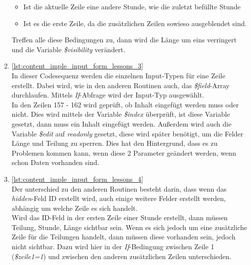 \begin{enumerate}
\begin{itemize}
		\item Ist die aktuelle Zeile eine andere Stunde, wie die zuletzt befüllte Stunde
		\item Ist es die erste Zeile, da die zusätzlichen Zeilen sowieso ausgeblendet sind.
	\end{itemize}
	Treffen alle diese Bedingungen zu, dann wird die Länge um eins verringert und die Variable \textit{\$visibility} verändert.\\
	
	\item \autoref{lst:content_imple_input_form_lessons_3}\\
	In dieser Codesequenz werden die einzelnen Input-Typen für eine Zeile erstellt. Dabei wird, wie in den anderen Routinen auch, das \textit{\$field}-Array durchlaufen. Mittels \textit{If}-Abfrage wird der Input-Typ ausgewählt.\\
	In den Zeilen 157 - 162 wird geprüft, ob Inhalt eingefügt werden muss oder nicht. Dies wird mittels der Variable \textit{\$index} überprüft, ist diese Variable gesetzt, dann muss ein Inhalt eingefügt werden. Außerdem wird auch die Variable \textit{\$edit} auf \textit{readonly} gesetzt, diese wird später benötigt, um die Felder Länge und Teilung zu sperren. Dies hat den Hintergrund, dass es zu Problemen kommen kann, wenn diese 2 Parameter geändert werden, wenn schon Daten vorhanden sind.\\
	
	\item \autoref{lst:content_imple_input_form_lessons_4}\\
	Der unterschied zu den anderen Routinen besteht darin, dass wenn das \textit{hidden}-Feld ID erstellt wird, auch einige weitere Felder erstellt werden, abhängig um welche Zeile es sich handelt.\\
	Wird das ID-Feld in der ersten Zeile einer Stunde erstellt, dann müssen Teilung, Stunde, Länge sichtbar sein. Wenn es sich jedoch um eine zusätzliche Zeile für die Teilungen handelt, dann müssen diese vorhanden sein, jedoch nicht sichtbar. Dazu wird hier in der \textit{If}-Bedingung zwischen Zeile 1 (\textit{\$zeile1=1}) und zwischen den anderen zusätzlichen Zeilen unterschieden.\\

\end{enumerate}
